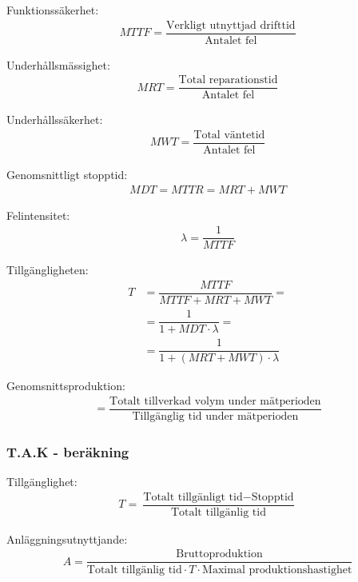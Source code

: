 			Funktionssäkerhet: 
      \begin{align*}
      MTTF = \dfrac{\text{Verkligt utnyttjad drifttid}}{\text{Antalet fel}} 
      \end{align*}
			
			Underhållsmässighet: 
      \begin{align*}
      MRT = \dfrac{\text{Total reparationstid}}{\text{Antalet fel}} 
      \end{align*}
			
			Underhållssäkerhet: 
      \begin{align*}
      MWT = \dfrac{\text{Total väntetid}}{\text{Antalet fel}} 
      \end{align*}
			
			Genomsnittligt stopptid: 
      \begin{align*}
      MDT = MTTR = MRT + MWT
      \end{align*}

			Felintensitet: 
      \begin{align*}
      \lambda = \dfrac{1}{MTTF} 
      \end{align*}

			Tillgängligheten: 
      \begin{align*}
        T &= \dfrac{MTTF}{MTTF+MRT+MWT} = \\ 
          &= \dfrac{1}{1+MDT\cdot\lambda} =\\
          &= \dfrac{1}{1+(MRT + MWT) \cdot \lambda}
      \end{align*}

      Genomsnittsproduktion: 
      \begin{align*}
			 = \dfrac{\text{Totalt tillverkad volym under mätperioden}}{\text{Tillgänglig tid under mätperioden}} 
      \end{align*}
			
			\subsubsection*{T.A.K - beräkning}
			
      Tillgänglighet: 
      \begin{align*}
			T = \dfrac{\text{Totalt tillgänligt tid} - \text{Stopptid}}{\text{Totalt tillgänlig tid}}
      \end{align*}
			
      Anläggningsutnyttjande:  
      \begin{align*}
			A = \dfrac{\text{Bruttoproduktion}}{\text{Totalt tillgänlig tid}\cdot T \cdot \text{Maximal produktionshastighet}}
      \end{align*}
				

